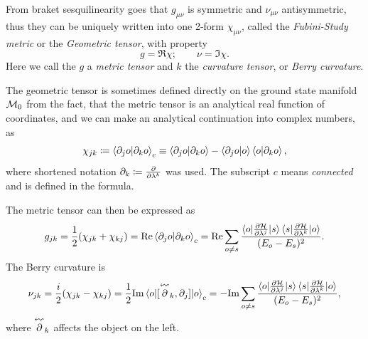 From braket sesquilinearity goes that $g_{\mu\nu}$ is symmetric and $\nu_{\mu\nu}$ antisymmetric, thus they can be uniquely written into one 2-form $\chi_{\mu\nu}$, called the \emph{Fubini-Study metric} or the \emph{Geometric tensor}, with property
\begin{equation}
    g=\Re \chi ;\qquad \nu=\Im \chi.
\end{equation}
Here we call the $g$ a \emph{metric tensor} and $k$ the \emph{curvature tensor}, or \emph{Berry curvature}. 

The geometric tensor is sometimes defined directly on the ground state manifold $\mathcal{M}_0$ from the fact, that the metric tensor is an analytical real function of coordinates, and we can make an analytical continuation into complex numbers, as
\begin{equation}
    \chi_{jk}\coloneqq \braket{\partial_j o|\partial_k o}_c \equiv \braket{\partial_j o|\partial_k o} - \braket{\partial_j o|o}\braket{o|\partial_k o},
    \label{eq:geometricTensor}
\end{equation}
where shortened notation $\partial_k\coloneqq\frac{\partial }{\partial \lambda^k}$ was used. The subscript $c$ means \emph{connected} and is defined in the formula.

The metric tensor can then be expressed as
\begin{equation}
    g_{jk} = \frac{1}{2}(\chi_{jk}+\chi_{kj}) = \text{Re}\braket{\partial_j o|\partial_k o}_c = \text{Re} \sum_{o\neq s}\frac{\braket{o|\frac{\partial \mathcal{H}}{\partial \lambda^j}|s}\braket{s|\frac{\partial \mathcal{H}}{\partial \lambda^k}|o}}{(E_o-E_s)^2}.
    \label{eq:metrictensorREdefinition}
\end{equation}
The Berry curvature is
\begin{equation}
        \nu_{jk} = \frac{i}{2}(\chi_{jk}-\chi_{kj})= \frac{1}{2}\Im\braket{o|[\curlyleftarrow{\partial}_k,\partial_j]|o}_c = - \Im \sum_{o\neq s}\frac{\braket{o|\pder{\H}{\lambda^j}|s}\braket{s|\pder{\H}{\lambda^k}|o}}{(E_o-E_s)^2},
    \label{eq:geom.tensorREdefinition}
\end{equation}
where $\curlyleftarrow{\partial}_k$ affects the object on the left.

